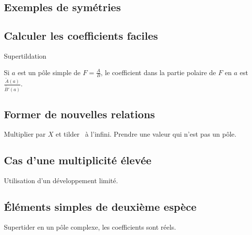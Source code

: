 \subsection{Exemples de symétries}

\subsection{Calculer les coefficients faciles}
Supertildation
\begin{prop}
Si $a$ est un pôle simple de $F=\frac{A}{B}$, le coefficient dans la partie polaire de $F$ en $a$ est $\frac{\widetilde{A}(a)}{\widetilde{B'}(a)}$. 
\end{prop}

\subsection{Former de nouvelles relations}
Multiplier par $X$ et \og tilder\fg~ à l'infini. Prendre une valeur qui n'est pas un pôle.

\subsection{Cas d'une multiplicité élevée}
Utilisation d'un développement limité.

\subsection{\'Eléments simples de deuxième espèce}
Supertider en un pôle complexe, les coefficients sont réels.


